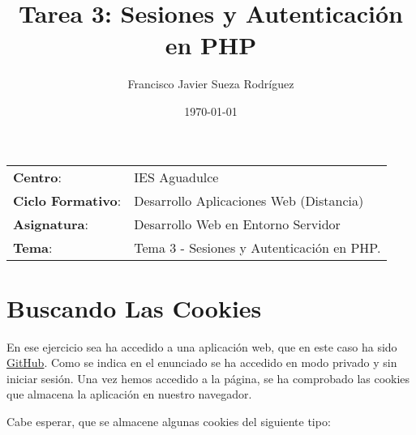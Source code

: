 


\title{
\vspace{10ex}
\normalfont \normalsize
\huge \textbf{Tarea 3: Sesiones y Autenticación en PHP}
}
\author{Francisco Javier Sueza Rodríguez}
\date{\normalsize\today}



\maketitle

\thispagestyle{empty}

\vspace{70ex}

\begin{center}
    \begin{tabular}{l l}
        \textbf{Centro}: & IES Aguadulce \\
        \textbf{Ciclo Formativo}: & Desarrollo Aplicaciones Web (Distancia)\\
        \textbf{Asignatura}: & Desarrollo Web en Entorno Servidor\\
        \textbf{Tema}: & Tema 3 -  Sesiones y Autenticación en PHP.\\
    \end{tabular}
\end{center}

\newpage

\section*{Buscando Las Cookies}
En ese ejercicio sea ha accedido a una aplicación web, que en este caso ha sido \href{https://github.com/}{GitHub}. Como se indica en el enunciado se ha accedido en modo privado y sin iniciar sesión. Una vez hemos accedido a la página, se ha comprobado las cookies que almacena la aplicación en nuestro navegador.

Cabe esperar, que se almacene algunas cookies del siguiente tipo:

